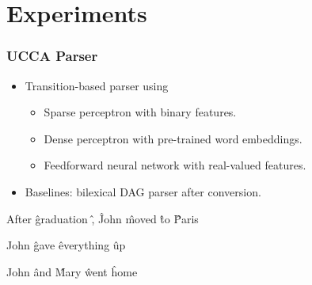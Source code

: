 \documentclass[t]{beamer}
\begin{document}
\section[]{Experiments}

\begin{frame}
\frametitle{UCCA Parser}
\begin{itemize}
 \item Transition-based parser using
 \begin{itemize}
   \item Sparse perceptron with binary features.
   \item Dense perceptron with pre-trained word embeddings.
   \item Feedforward neural network with real-valued features.
 \end{itemize}
 \item Baselines: bilexical DAG parser after conversion.
\end{itemize}
\vspace*{\fill}
\begin{center}
	\begin{dependency}[theme = simple]
	\begin{deptext}[column sep=.7em,ampersand replacement=\^]
	After \^ graduation \^ , \^ John \^ moved \^ to \^ Paris \\
	\end{deptext}
	\end{dependency}
	\begin{dependency}[theme = simple]
	\begin{deptext}[column sep=.7em,ampersand replacement=\^]
	John \^ gave \^ everything \^ up \\
	\end{deptext}
	\end{dependency}
  \hspace*{\fill}
	\begin{dependency}[theme = simple]
	\begin{deptext}[column sep=.7em,ampersand replacement=\^]
	John \^ and \^ Mary \^ went \^ home \\
	\end{deptext}
	\end{dependency}
\end{center}
\end{frame}
\end{document}

